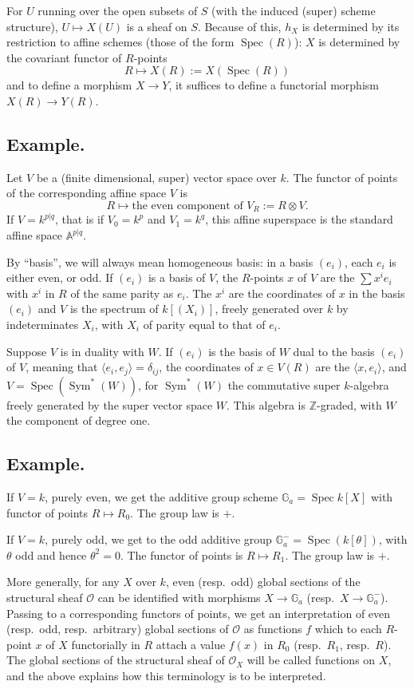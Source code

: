 \documentclass[11pt,a4paper]{article}
\theoremstyle{plain}
\theoremstyle{definition}
\DeclareMathOperator{\Spec}{Spec}
\DeclareMathOperator{\Sym}{Sym}
\newcommand{\Z}{\mathbb{Z}}
\begin{document}
For $U$ running over the open subsets of $S$ (with the induced (super) scheme structure), $U \mapsto X(U)$ is a sheaf on $S$. Because of this, $h_X$ is determined by its restriction to affine schemes (those of the form $\Spec(R)$): $X$ is determined by the covariant functor of $R$-points
\[
R \mapsto X(R) := X(\Spec(R))
\]
and to define a morphism $X \to Y$, it suffices to define a functorial morphism $X(R) \to Y(R)$.

\subsection{Example.}
Let $V$ be a (finite dimensional, super) vector space over $k$. The functor of points of the corresponding affine space $V$ is
\[
R \mapsto \text{the even component of } V_R := R \otimes V.
\]
If $V = k^{p|q}$, that is if $V_0 = k^p$ and $V_1 = k^q$, this affine superspace is the standard affine space $\mathbb{A}^{p|q}$.

By ``basis'', we will always mean homogeneous basis: in a basis $(e_i)$, each $e_i$ is either even, or odd. If $(e_i)$ is a basis of $V$, the $R$-points $x$ of $V$ are the $\sum x^i e_i$ with $x^i$ in $R$ of the same parity as $e_i$. The $x^i$ are the coordinates of $x$ in the basis $(e_i)$ and $V$ is the spectrum of $k[(X_i)]$, freely generated over $k$ by indeterminates $X_i$, with $X_i$ of parity equal to that of $e_i$.

Suppose $V$ is in duality with $W$. If $(e_i)$ is the basis of $W$ dual to the basis $(e_i)$ of $V$, meaning that $\langle e_i, e_j \rangle = \delta_{ij}$, the coordinates of $x \in V(R)$ are the $\langle x, e_i \rangle$, and $V = \Spec(\Sym^*(W))$, for $\Sym^*(W)$ the commutative super $k$-algebra freely generated by the super vector space $W$. This algebra is $\Z$-graded, with $W$ the component of degree one.

\subsection{Example.}
If $V = k$, purely even, we get the additive group scheme $\mathbb{G}_a = \Spec k[X]$ with functor of points $R \mapsto R_0$. The group law is $+$.

If $V = k$, purely odd, we get to the odd additive group $\mathbb{G}_a^- = \Spec(k[\theta])$, with $\theta$ odd and hence $\theta^2 = 0$. The functor of points is $R \mapsto R_1$. The group law is $+$.

More generally, for any $X$ over $k$, even (resp.\ odd) global sections of the structural sheaf $\mathcal{O}$ can be identified with morphisms $X \to \mathbb{G}_a$ (resp.\ $X \to \mathbb{G}_a^-$). Passing to a corresponding functors of points, we get an interpretation of even (resp.\ odd, resp.\ arbitrary) global sections of $\mathcal{O}$ as functions $f$ which to each $R$-point $x$ of $X$ functorially in $R$ attach a value $f(x)$ in $R_0$ (resp.\ $R_1$, resp.\ $R$). The global sections of the structural sheaf of $\mathcal{O}_X$ will be called functions on $X$, and the above explains how this terminology is to be interpreted.
\end{document}
